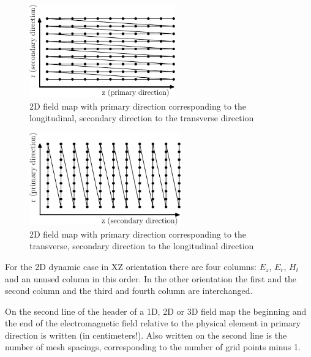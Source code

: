 \begin{figure}[ht]
  \begin{center}
    \includegraphics[origin=bl,height=40mm,angle=0]{./figures/Fieldmaps/order-1.pdf}
    \caption[Order of field values in a 2D field map in XZ orientation]{2D field map with primary direction corresponding to the longitudinal, secondary direction to the transverse direction}
    \label{fig:order1}
  \end{center}
\end{figure}

\begin{figure}[ht]
  \begin{center}
    \includegraphics[origin=bl,height=40mm,angle=0]{./figures/Fieldmaps/order-2.pdf}
    \caption[Order of field values in a 2D field map in ZX orientation]{2D field map with primary direction corresponding to the transverse, secondary direction to the longitudinal direction}
    \label{fig:order2}
  \end{center}
\end{figure}

For the 2D dynamic case in XZ orientation there are four columns: $E_z$, $E_r$, $H_t$ and an unused column in this order. In the other orientation the first and the second column and the third and fourth column are interchanged.

On the second line of the header of a 1D, 2D or 3D field map the beginning and the end of the electromagnetic field relative to the physical element in primary direction is written (in centimeters!). Also written on the second line is the number of mesh spacings, corresponding to the number of grid points minus 1.

